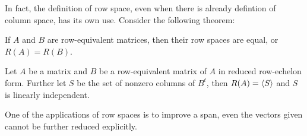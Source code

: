 \documentclass[a4paper,12pt]{article}
\begin{document}
In fact, the definition of row space, even when there is already defintion of column space, has its own use. Consider the following theorem:

\begin{thm}
  If $A$ and $B$ are row-equivalent matrices, then their row spaces are equal, or $R(A)=R(B)$.
\end{thm}\n

\begin{thm}
  Let $A$ be a matrix and $B$ be a row-equivalent matrix of $A$ in reduced row-echelon form. Further let $S$ be the set of nonzero columns of $B^{t}$, then $R(A)=\left\langle S\right\rangle$ and $S$ is linearly independent.
\end{thm}\n

One of the applications of row spaces is to improve a span, even the vectors given cannot be further reduced explicitly.\n
\end{document}
